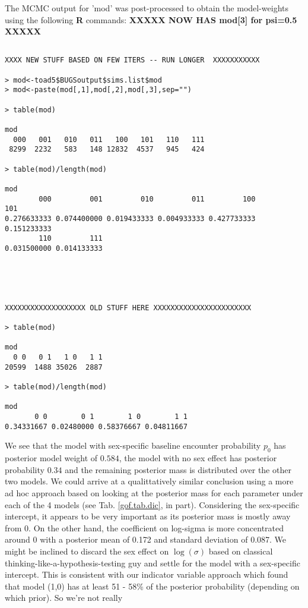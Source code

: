 The MCMC output for 'mod' was post-processed to obtain the
model-weights using the following  {\bf R} commands:
{\bf XXXXX NOW HAS mod[3] for psi=0.5 XXXXX}
\begin{verbatim}

XXXX NEW STUFF BASED ON FEW ITERS -- RUN LONGER  XXXXXXXXXXX

> mod<-toad5$BUGSoutput$sims.list$mod
> mod<-paste(mod[,1],mod[,2],mod[,3],sep="")

> table(mod)

mod
  000   001   010   011   100   101   110   111 
 8299  2232   583   148 12832  4537   945   424 

> table(mod)/length(mod)

mod
        000         001         010         011         100         101 
0.276633333 0.074400000 0.019433333 0.004933333 0.427733333 0.151233333 
        110         111 
0.031500000 0.014133333 





XXXXXXXXXXXXXXXXXXX OLD STUFF HERE XXXXXXXXXXXXXXXXXXXXXXX

> table(mod)

mod
  0 0   0 1   1 0   1 1
20599  1488 35026  2887

> table(mod)/length(mod)

mod
       0 0        0 1        1 0        1 1
0.34331667 0.02480000 0.58376667 0.04811667
\end{verbatim}
We see that the model with sex-specific baseline encounter probability
$p_{0}$ has posterior model weight of $0.584$, the model with no sex
effect has posterior probability $0.34$ and the remaining posterior mass is distributed
over the other two models. We could arrive at a qualittatively similar
conclusion using a more ad hoc approach based on looking at the
posterior mass for each parameter under each of the 4 models (see
Tab. \ref{gof.tab.dic}, in part). Considering the sex-specific intercept, it
appears to be very important as its posterior mass is mostly away from 0.
On the other hand,  the
coefficient on log-sigma is more concentrated around 0 with a
posterior mean of 
0.172 and standard deviation of 0.087.  We might be inclined to
discard the sex effect on $\log(\sigma)$ based 
on classical thinking-like-a-hypothesis-testing guy and settle for the
model with a sex-specific intercept. This is consistent with our
indicator variable approach which found that model (1,0)
has at least 51 - 58\% of the
posterior probability (depending on which prior). So we're not really
